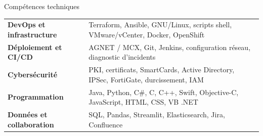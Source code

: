 \documentclass[
    10pt,
]{style} %
\begin{document}

    \begin{rSection}{Compétences techniques}

        \begin{tabularx}{\linewidth}{@{} >{\bfseries}l @{\hspace{3ex}} X @{}}
            DevOps et infrastructure & Terraform, Ansible, GNU/Linux, scripts shell, VMware/vCenter, Docker, OpenShift \\
            Déploiement et CI/CD & AGNET / MCX, Git, Jenkins, configuration réseau, diagnostic d’incidents \\
            Cybersécurité & PKI, certificats, SmartCards, Active Directory, IPSec, FortiGate, durcissement, IAM \\
            Programmation & Java, Python, C\#, C, C++, Swift, Objective-C, JavaScript, HTML, CSS, VB .NET \\
            Données et collaboration & SQL, Pandas, Streamlit, Elasticsearch, Jira, Confluence \\
        \end{tabularx}

    \end{rSection}
\end{document}
